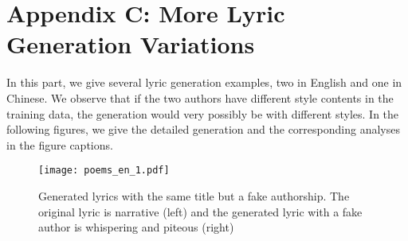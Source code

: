 \documentclass[a4paper]{article}
\begin{document}
\section*{Appendix C: More Lyric Generation Variations}
In this part, we give several lyric generation examples, two in English and one in Chinese. We observe that if the two authors have different style contents in the training data, the generation would very possibly be with different styles. In the following figures, we give the detailed generation and the corresponding analyses in the figure captions.

\begin{figure*}[t]\centering
\begin{center}
    {
    \vspace{-0.2cm}
    \texttt{[image: poems\_en\_1.pdf]}
    \vspace{-0.2cm}
    }
    \caption{Generated lyrics with the same title but a fake authorship. The original lyric is narrative (left) and the generated lyric with a fake author is whispering and piteous (right)}
    \vspace{-0.2cm}
\end{center}
\end{figure*}
\end{document}
